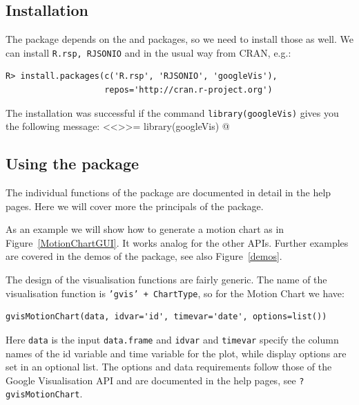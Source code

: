\subsection{Installation}
The \googleVis  package depends on the \rjsonio and
\rsp packages, so we need to install those as well. 
We can install \texttt{R.rsp, RJSONIO} and \googleVis in the usual way from CRAN, e.g.:
\begin{verbatim}
R> install.packages(c('R.rsp', 'RJSONIO', 'googleVis'), 
                    repos='http://cran.r-project.org') 
\end{verbatim}

The installation was successful if the
command \texttt{library(googleVis)} gives you the following message:
<<>>=
library(googleVis)
@ 


\subsection{Using the  \googleVis package}

The individual functions of the \googleVis package are documented in
detail in the help pages. Here we will cover more the principals of
the package.

As an example we will show how to generate a motion chart as in  
Figure~\ref{MotionChartGUI}. It works analog for the other
APIs. Further examples are covered in the demos of the \googleVis
package, see also Figure~\ref{demos}. 

The design of the visualisation functions are fairly generic. The name
of the visualisation function is \texttt{'gvis' + ChartType}, so for
the Motion Chart we have: 
\begin{verbatim}
gvisMotionChart(data, idvar='id', timevar='date', options=list())
\end{verbatim}
Here \texttt{data} is the input \texttt{data.frame} and \texttt{idvar}
and \texttt{timevar} specify the column names of the id variable and
time variable for the plot, while display options are set in an
optional list. The options and data requirements follow those of the
Google Visualisation API and are documented in the help pages, see
\texttt{?gvisMotionChart}.  

